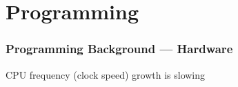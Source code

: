 \section{Programming}


\begin{frame}
    \frametitle{Programming Background --- Hardware}

    CPU frequency (clock speed) growth is slowing

    \begin{figure}
       \begin{center}
       \end{center}
    \end{figure}

\end{frame}


